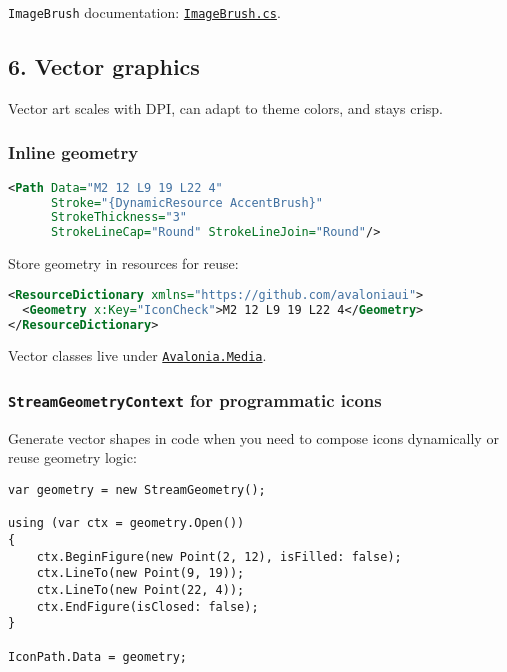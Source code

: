 \passthrough{\lstinline!ImageBrush!} documentation:
\href{https://github.com/AvaloniaUI/Avalonia/blob/master/src/Avalonia.Base/Media/ImageBrush.cs}{\passthrough{\lstinline!ImageBrush.cs!}}.

\subsection{6. Vector graphics}\label{vector-graphics}

Vector art scales with DPI, can adapt to theme colors, and stays crisp.

\subsubsection{Inline geometry}\label{inline-geometry}

\begin{lstlisting}[language=XML]
<Path Data="M2 12 L9 19 L22 4"
      Stroke="{DynamicResource AccentBrush}"
      StrokeThickness="3"
      StrokeLineCap="Round" StrokeLineJoin="Round"/>
\end{lstlisting}

Store geometry in resources for reuse:

\begin{lstlisting}[language=XML]
<ResourceDictionary xmlns="https://github.com/avaloniaui">
  <Geometry x:Key="IconCheck">M2 12 L9 19 L22 4</Geometry>
</ResourceDictionary>
\end{lstlisting}

Vector classes live under
\href{https://github.com/AvaloniaUI/Avalonia/tree/master/src/Avalonia.Base/Media}{\passthrough{\lstinline!Avalonia.Media!}}.

\subsubsection{\texorpdfstring{\texttt{StreamGeometryContext} for
programmatic
icons}{StreamGeometryContext for programmatic icons}}\label{streamgeometrycontext-for-programmatic-icons}

Generate vector shapes in code when you need to compose icons
dynamically or reuse geometry logic:

\begin{lstlisting}
var geometry = new StreamGeometry();

using (var ctx = geometry.Open())
{
    ctx.BeginFigure(new Point(2, 12), isFilled: false);
    ctx.LineTo(new Point(9, 19));
    ctx.LineTo(new Point(22, 4));
    ctx.EndFigure(isClosed: false);
}

IconPath.Data = geometry;
\end{lstlisting}

